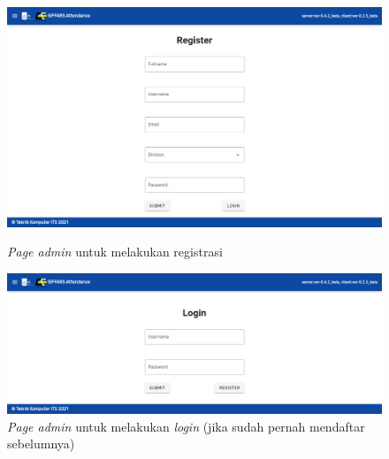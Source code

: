 \begin{figure} [p] \centering
  \includegraphics[scale=0.2]{gambar/register.png}
  \caption{\textit{Page admin} untuk melakukan registrasi}
  \label{fig:SfRegis}
  
  \includegraphics[scale=0.2]{gambar/login.png}
  \caption{\textit{Page admin} untuk melakukan \textit{login} (jika sudah pernah mendaftar sebelumnya)}
  \label{fig:SfLogin}
\end{figure}

